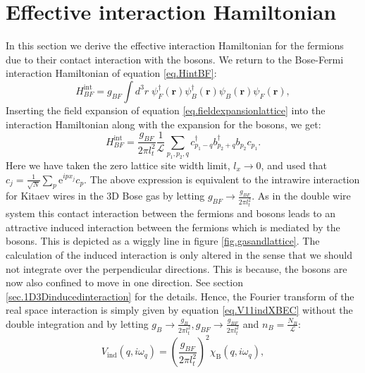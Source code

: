\section{Effective interaction Hamiltonian} \label{sec.interaction.lattice}
In this section we derive the effective interaction Hamiltonian for the fermions due to their contact interaction with the bosons. We return to the Bose-Fermi interaction Hamiltonian of equation \eqref{eq.HintBF}:
\begin{equation}
H_{BF}^\text{int} = g_{BF}\int d^3 r \; \psi_F^\dagger(\mathbf{r}) \psi_B^\dagger(\mathbf{r})\psi_B(\mathbf{r})\psi_F(\mathbf{r}),
\end{equation} 
Inserting the field expansion of equation \eqref{eq.fieldexpansionlattice} into the interaction Hamiltonian along with the expansion for the bosons, we get:
\begin{equation}
H_{BF}^{\text{int}} = \frac{g_{BF}}{2\pi l_t^2}\frac{1}{\mathcal{L}}\sum_{p_1, p_2, q} c^\dagger_{p_1 - q}b^\dagger_{p_2 + q}b_{p_2}c_{p_1}. \nonumber
\end{equation}
Here we have taken the zero lattice site width limit, $l_x \to 0$, and used that $c_j = \frac{1}{\sqrt{N}}\sum_p \text{e}^{ipx_j}c_p$. The above expression is equivalent to the intrawire interaction for Kitaev wires in the 3D Bose gas by letting $g_{BF} \to \frac{g_{BF}}{2\pi l_t^2}$. As in the double wire system this contact interaction between the fermions and bosons leads to an attractive induced interaction between the fermions which is mediated by the bosons. This is depicted as a wiggly line in figure \ref{fig.gasandlattice}. The calculation of the induced interaction is only altered in the sense that we should not integrate over the perpendicular directions. This is because, the bosons are now also confined to move in one direction. See section \ref{sec.1D3Dinducedinteraction} for the details. Hence, the Fourier transform of the real space interaction is simply given by equation \eqref{eq.V11indXBEC} without the double integration and by letting $g_B \to \frac{g_B}{2\pi l_t^2}, g_{BF} \to \frac{g_{BF}}{2\pi l_t^2}$ and $n_B = \frac{N_B}{\mathcal{L}}$:
\begin{equation}
V_{\text{ind}}(q, i\omega_q) = \left(\frac{g_{BF}}{2\pi l_t^2}\right)^2 \chi_\text{B}(q, i\omega_q), 
\label{eq.VFFmomentumspace.kitaevchain}
\end{equation}
